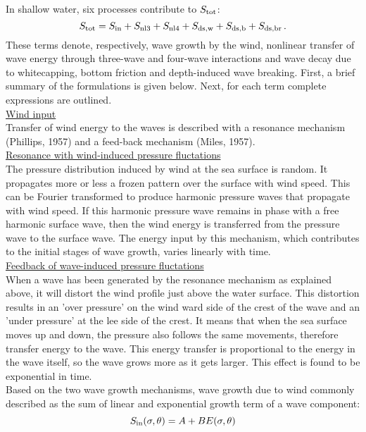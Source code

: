 \documentclass[12pt]{book}
\begin{document}
In shallow water, six processes contribute to $S_{\rm tot}$:
\begin{equation}
  S_{\rm tot} = S_{\rm in} + S_{\rm nl3} + S_{\rm nl4} +
                     S_{\rm ds,w} + S_{\rm ds,b} + S_{\rm ds,br}\, .
  \label{eq:source}
\end{equation}
These terms denote, respectively, wave growth by the wind, nonlinear transfer of wave energy
through three-wave and four-wave interactions and wave decay due to whitecapping, bottom friction
and depth-induced wave breaking. First, a brief summary of the formulations is given below. Next,
for each term complete expressions are outlined.
\\[2ex]
\noindent
\underline{Wind input}\\[2ex]
Transfer of wind energy to the waves is described with a resonance mechanism (Phillips, 1957) and a
feed-back mechanism (Miles, 1957).
\\[2ex]
\noindent
\underline{Resonance with wind-induced pressure fluctations}\\[2ex]
The pressure distribution induced by wind at the sea surface is random. It propagates
more or less a frozen pattern over the surface with wind speed. This can be Fourier
transformed to produce harmonic pressure waves that propagate with wind speed. If this
harmonic pressure wave remains in phase with a free harmonic surface wave, then
the wind energy is transferred from the pressure wave to the surface wave. The energy
input by this mechanism, which contributes to the initial stages of wave growth,
varies linearly with time.
\\[2ex]
\noindent
\underline{Feedback of wave-induced pressure fluctations}\\[2ex]
When a wave has been generated by the resonance mechanism as explained above, it will
distort the wind profile just above the water surface. This distortion results in an
'over pressure' on the wind ward side of the crest of the wave and an 'under pressure'
at the lee side of the crest. It means that when the sea surface moves up and down,
the pressure also follows the same movements, therefore transfer energy to the wave.
This energy transfer is proportional to the energy in the wave itself, so the wave
grows more as it gets larger. This effect is found to be exponential in time.
\\[2ex]
\noindent
Based on the two wave growth mechanisms, wave growth due to wind commonly described
as the sum of linear and exponential growth term of a wave component:
\begin{equation}
  S_{\rm in} (\sigma, \theta) = A + B E(\sigma,\theta)
  \label{eq2-3}
\end{equation}
\end{document}

